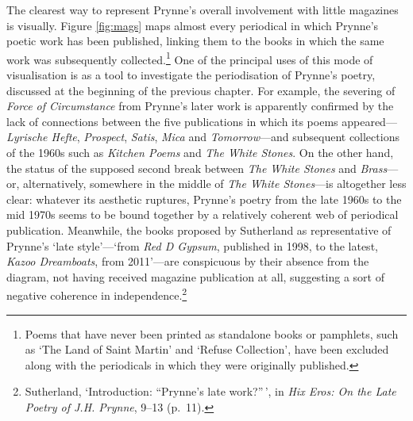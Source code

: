 \documentclass[]{article}
\begin{document}
The clearest way to represent Prynne's overall involvement with little
magazines is visually. Figure \ref{fig:mags} maps almost every
periodical in which Prynne's poetic work has been published, linking
them to the books in which the same work was subsequently
collected.\footnote{Poems that have never been printed as standalone
  books or pamphlets, such as `The Land of Saint Martin' and `Refuse
  Collection', have been excluded along with the periodicals in which
  they were originally published.} One of the principal uses of this
mode of visualisation is as a tool to investigate the periodisation of
Prynne's poetry, discussed at the beginning of the previous chapter. For
example, the severing of \emph{Force of Circumstance} from Prynne's
later work is apparently confirmed by the lack of connections between
the five publications in which its poems appeared---\emph{Lyrische
Hefte}, \emph{Prospect}, \emph{Satis}, \emph{Mica} and
\emph{Tomorrow}---and subsequent collections of the 1960s such as
\emph{Kitchen Poems} and \emph{The White Stones}. On the other hand, the
status of the supposed second break between \emph{The White Stones} and
\emph{Brass}---or, alternatively, somewhere in the middle of \emph{The
White Stones}---is altogether less clear: whatever its aesthetic
ruptures, Prynne's poetry from the late 1960s to the mid 1970s seems to
be bound together by a relatively coherent web of periodical
publication. Meanwhile, the books proposed by Sutherland as
representative of Prynne's `late style'---`from \emph{Red D Gypsum},
published in 1998, to the latest, \emph{Kazoo Dreamboats}, from
2011'---are conspicuous by their absence from the diagram, not having
received magazine publication at all, suggesting a sort of negative
coherence in independence.\footnote{Sutherland, `Introduction:
  ``Prynne's late work?''\,', in \emph{Hix Eros: On the Late Poetry of
  J.H. Prynne}, 9--13 (p.~11).}
\end{document}
